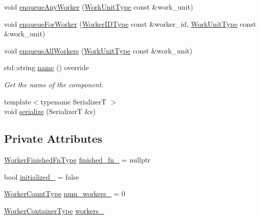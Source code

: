 \begin{DoxyCompactItemize}
\item 
void \hyperlink{structvt_1_1worker_1_1_worker_group_any_a9f8a255853db11824212dcba4faaaf13}{enqueue\+Any\+Worker} (\hyperlink{namespacevt_1_1worker_a59d2fcdafa81fc0af7f921a258e42202}{Work\+Unit\+Type} const \&work\+\_\+unit)
\item 
void \hyperlink{structvt_1_1worker_1_1_worker_group_any_a7f800682c86f876c626d3ee1b9735680}{enqueue\+For\+Worker} (\hyperlink{namespacevt_a656e362091da17b9b93d0655b36e3392}{Worker\+I\+D\+Type} const \&worker\+\_\+id, \hyperlink{namespacevt_1_1worker_a59d2fcdafa81fc0af7f921a258e42202}{Work\+Unit\+Type} const \&work\+\_\+unit)
\item 
void \hyperlink{structvt_1_1worker_1_1_worker_group_any_a87944f965a0e1a918257be0ceff011a5}{enqueue\+All\+Workers} (\hyperlink{namespacevt_1_1worker_a59d2fcdafa81fc0af7f921a258e42202}{Work\+Unit\+Type} const \&work\+\_\+unit)
\item 
std\+::string \hyperlink{structvt_1_1worker_1_1_worker_group_any_a29dc03c300f442508501671d9ec1eecd}{name} () override
\begin{DoxyCompactList}\small\item\em Get the name of the component. \end{DoxyCompactList}\item 
{\footnotesize template$<$typename SerializerT $>$ }\\void \hyperlink{structvt_1_1worker_1_1_worker_group_any_af161693de4c05d8c3d09e56a3002907a}{serialize} (SerializerT \&s)
\end{DoxyCompactItemize}
\subsection*{Private Attributes}
\begin{DoxyCompactItemize}
\item 
\hyperlink{namespacevt_1_1worker_ae32a174a5348d27aafe73c2debea1a94}{Worker\+Finished\+Fn\+Type} \hyperlink{structvt_1_1worker_1_1_worker_group_any_ad4f81de6e1790126e507cde8e54ed864}{finished\+\_\+fn\+\_\+} = nullptr
\item 
bool \hyperlink{structvt_1_1worker_1_1_worker_group_any_a3075586e7c554a3d2ca71d657a084b5e}{initialized\+\_\+} = false
\item 
\hyperlink{namespacevt_aa93398ea48f2cb6c188512250f7cc248}{Worker\+Count\+Type} \hyperlink{structvt_1_1worker_1_1_worker_group_any_a84a8e36ce6d70e66b712ce04f224fd64}{num\+\_\+workers\+\_\+} = 0
\item 
\hyperlink{structvt_1_1worker_1_1_worker_group_any_ad7e74c099f11c75bc35c838baedaa2cd}{Worker\+Container\+Type} \hyperlink{structvt_1_1worker_1_1_worker_group_any_a370802bca31db13895b73f19d699ea3b}{workers\+\_\+}
\end{DoxyCompactItemize}
